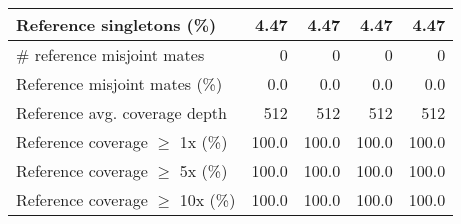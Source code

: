 \documentclass[12pt,a4paper]{article}
\begin{document}
\begin{table}[ht]
\begin{center}
\begin{tabular}{|l*{4}{|r}|}
Reference singletons (\%) & 4.47 & 4.47 & 4.47 & 4.47 \\ \hline
\# reference misjoint mates & 0 & 0 & 0 & 0 \\ \hline
Reference misjoint mates (\%) & 0.0 & 0.0 & 0.0 & 0.0 \\ \hline
Reference avg. coverage depth & 512 & 512 & 512 & 512 \\ \hline
Reference coverage $\geq$ 1x (\%) & 100.0 & 100.0 & 100.0 & 100.0 \\ \hline
Reference coverage $\geq$ 5x (\%) & 100.0 & 100.0 & 100.0 & 100.0 \\ \hline
Reference coverage $\geq$ 10x (\%) & 100.0 & 100.0 & 100.0 & 100.0 \\ \hline
\end{tabular}
\end{center}
\end{table}
\end{document}
